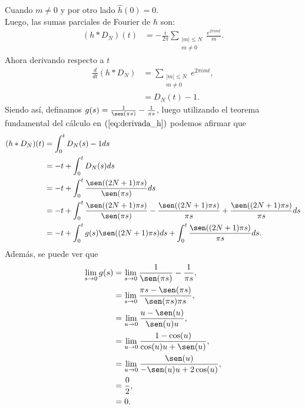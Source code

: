 Cuando $m\neq 0$ y por otro lado $\hat{h}(0)=0$.\\
Luego, las sumas parciales de Fourier de $h$ son:
\begin{equation}\label{eq:serie_h}
  \begin{split}    
    (h*D_{N})(t)&=-\frac{i}{2\pi}\sum_{\substack{|m| \leq N \\ m \neq 0}}\frac{e^{2\pi i mt}}{m}.
  \end{split}
\end{equation}
Ahora derivando respecto a $t$
\begin{equation}\label{eq:derivada_h}
  \begin{split}
    \frac{d}{dt}(h*D_{N})&=\sum_{\substack{|m| \leq N \\ m \neq 0}}e^{2\pi imt},\\
    &=D_{N}(t)-1.    
  \end{split}
\end{equation}
Siendo así, definamos $g(s)=\frac{1}{\sen(\pi s)}-\frac{1}{\pi s}$, luego utilizando el teorema fundamental del cálculo en $(\ref{eq:derivada_h})$ podemos afirmar que
\begin{equation}\label{eq:convolucion}
  \begin{split}
    (h*D_{N})(t)&=\int_{0}^{t}D_{N}(s)-1ds\\
    &=-t + \int_{0}^{t}D_{N}(s)ds\\
    &=-t + \int_{0}^{t}\frac{\sen((2N+1)\pi s)}{\sen(\pi s)}ds\\
    &=-t + \int_{0}^{t}\frac{\sen((2N+1)\pi s)}{\sen(\pi s)}-\frac{\sen((2N+1)\pi s)}{\pi s}+\frac{\sen((2N+1)\pi s)}{\pi s}ds\\
    &=-t + \int_{0}^{t}g(s)\sen((2N+1)\pi s)ds +\int_{0}^{t}\frac{\sen((2N+1)\pi s)}{\pi s}ds.
  \end{split}
\end{equation}
Además, se puede ver que
\begin{align*}
  \lim_{s \to 0}g(s)&=\lim_{s \to 0}\frac{1}{\sen(\pi s)}-\frac{1}{\pi s},\\
  &=\lim_{s \to 0}\frac{\pi s-\sen(\pi s)}{\sen(\pi s)\pi s},\\
  &=\lim_{u \to 0}\frac{u-\sen(u)}{\sen(u)u},\\
  &=\lim_{u \to 0}\frac{1-\cos(u)}{\cos(u)u+\sen(u)},\\
  &=\lim_{u \to 0}\frac{\sen(u)}{-\sen(u)u+2\cos(u)},\\
  &=\frac{0}{2},\\
  &=0.
\end{align*}
